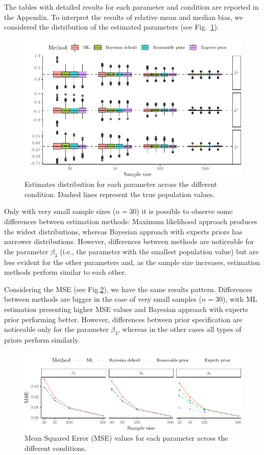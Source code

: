 \documentclass[graybox]{svmult}
\begin{document}
The tables with detailed results for each parameter and condition are reported in the Appendix. To interpret the results of relative mean and median bias, we considered the distribution of the estimated parameters (see Fig.~\ref{fig:boxplots}).
\begin{figure}[b]
	\sidecaption
	\includegraphics[width = 1\textwidth]{figure/Plot_boxplots}
	\caption{Estimates distribution for each parameter across the different condition. Dashed lines represent the true population values.}
	\label{fig:boxplots}
\end{figure}
Only with very small sample sizes ($n=30$) it is possible to observe some differences between estimation methods: Maximum likelihood approach produces the widest distributions, whereas Bayesian approach with experts priors has narrower distributions. However, differences between methods are noticeable for the parameter $\beta_3$ (i.e., the parameter with the smallest population value) but are less evident for the other parameters and, as the sample size increases, estimation methods perform similar to each other.

Considering the MSE (see Fig.\ref{fig:mse}), we have the same results pattern. Differences between methods are bigger in the case of very small samples ($n=30$), with ML estimation presenting higher MSE values and Bayesian approach with experts prior performing better. However, differences between prior specification are noticeable only for the parameter $\beta_3$, whereas in the other cases all types of priors perform similarly.
\begin{figure}[t]
	\sidecaption
	\includegraphics[width = 1\textwidth]{figure/Plot_MSE}
	\caption{Mean Squared Error (MSE) values for each parameter across the different conditions.}
	\label{fig:mse}
\end{figure}
\end{document}
